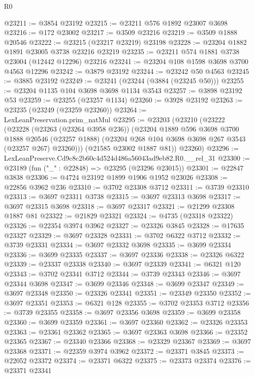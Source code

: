 \begin{lexlean}{R0}
\begin{coremodule}
@23211 := @3854 @23192
@23215 := @23211 @576 @1892 @23007 @3698
@23216 := @172 @23002
@23217 := @3509 @23216
@23219 := @3509 @1888 @20546
@23222 := @23215 (@23217 @23219) @23198
@23228 := @23204 @1882 @1891 @23005 @3738 @23216 @23219
@23235 := @23211 @574 @1881 @3738 @23004 (@12442 @12296) @23216
@23241 := @23204 @108 @1598 @3698 @3700 @4563 @12296
@23242 := @3879 @23192
@23244 := @23242 @50 @4563
@23245 := @3885 @23192
@23249 := @23241 (@23244 (@3884 (@23245 @50)))
@23255 := @23204 @1135 @104 @3698 @3698 @1134 @3543
@23257 := @3898 @23192 @53
@23259 := @23255 (@23257 @1134)
@23260 := @3928 @23192
@23263 := @23235 (@23249 (@23259 @23260))
@23264 := LexLeanPreservation.prim_natMul
@23295 := @23203
    (@23210
      (@23222
        (@23228
          (@23263 (@23264 @3958 @236))
          (@23204
            @1889
            @596
            @3698
            @3700
            @1888
            @20546
            (@23257 @1888)
            (@23204 @268 @104 @3698 @3698 @267 @3543 (@23257 @267) @23260)))
        (@21585 @23002 @1887 @81))
      @23260)
@23296 := LexLeanPreserve.Cd9c8c2b60c4d524d486a56043ad9eb82.R0.__rel_31
@23300 := @23189 (fun ("_" : @22848) => @23295 (@23296 @23015))
@23301 := @22847 @3838
@23306 := @4724 @23192 @1899 @1906 @1952 @23026
@23308 := @22856 @3962 @236
@23310 := @3702 @23308 @3712
@23311 := @3739 @23310
@23313 := @3697 @23311 @3738
@23315 := @3697 @23313 @3698
@23317 := @3697 @23315 @3698
@23318 := @3697 @23317
@23321 := @21299 @23308 @1887 @81
@23322 := @21829 @23321
@23324 := @4735 (@23318 @23322)
@23326 := @22354 @3974 @3962
@23327 := @23326 @3845
@23328 := @17635 @23327
@23329 := @3697 @23328
@23331 := @3702 @6322 @3712
@23332 := @3739 @23331
@23334 := @3697 @23332 @3698
@23335 := @3699 @23334
@23336 := @3699 @23335
@23337 := @3697 @23336
@23338 := @23326 @6322
@23339 := @23337 @23338
@23340 := @3697 @23339
@23341 := @6321 @120
@23343 := @3702 @23341 @3712
@23344 := @3739 @23343
@23346 := @3697 @23344 @3698
@23347 := @3699 @23346
@23348 := @3699 @23347
@23349 := @3697 @23348
@23350 := @23326 @23341
@23351 := @23349 @23350
@23352 := @3697 @23351
@23353 := @6321 @128
@23355 := @3702 @23353 @3712
@23356 := @3739 @23355
@23358 := @3697 @23356 @3698
@23359 := @3699 @23358
@23360 := @3699 @23359
@23361 := @3697 @23360
@23362 := @23326 @23353
@23363 := @23361 @23362
@23365 := @3697 @23363 @3698
@23366 := @23352 @23365
@23367 := @23340 @23366
@23368 := @23329 @23367
@23369 := @3697 @23368
@23371 := @22359 @3974 @3962
@23372 := @23371 @3845
@23373 := @22052 @23372
@23374 := @23371 @6322
@23375 := @23373 @23374
@23376 := @23371 @23341

\end{coremodule}
\end{lexlean}
